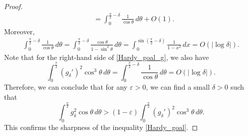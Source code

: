 \documentclass[reqno, 11pt]{amsart}
\theoremstyle{plain}
\theoremstyle{definition}
\theoremstyle{remark}
\numberwithin{equation}{section}
\begin{document}
\begin{proof}
\begin{align*}
&= \int_0^{\frac{\pi}{2} - \delta} \frac{1}{\cos \theta} \, d\theta + O(1).
\end{align*}
Moreover,
\begin{align*}
\int_0^{\frac{\pi}{2} - \delta} \frac{1}{\cos \theta} \, d\theta = \int_0^{\frac{\pi}{2} - \delta} \frac{\cos \theta}{1 - \sin^2 \theta} \, d\theta= \int_0^{\sin (\frac{\pi}{2} - \delta)} \frac{1}{1-x^2} \, dx = O(|\log \delta|).
\end{align*}
Note that for the right-hand side of \eqref{Hardy_goal_g}, we also have
$$
 \int_0^{\frac{\pi}{2}} (g_\delta')^2 \cos^3 \theta \, d\theta = \int_0^{\frac{\pi}{2} - \delta} \frac{1}{\cos \theta} \, d\theta = O(|\log \delta|).
$$
Therefore, we can conclude that for any $\varepsilon > 0$, we can find a small $\delta > 0$ such that
$$
\int_0^{\frac{\pi}{2}} g_\delta^2 \cos \theta \,d\theta > (1-\varepsilon)  \int_0^{\frac{\pi}{2}} (g_\delta')^2 \cos^3 \theta \, d\theta.
$$
This confirms the sharpness of the inequality \eqref{Hardy_goal}.
\end{proof}
\end{document}
